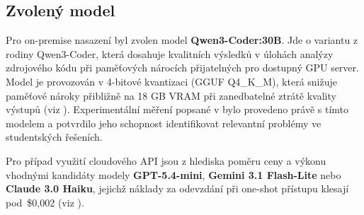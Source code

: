 \subsection{Zvolený model}
\label{subsec:choice-model}

Pro on-premise nasazení byl zvolen model \textbf{Qwen3-Coder:30B}.
Jde o variantu z rodiny Qwen3-Coder, která dosahuje kvalitních výsledků v úlohách analýzy zdrojového kódu při paměťových nárocích přijatelných pro dostupný GPU server.
Model je provozován v 4-bitové kvantizaci (GGUF Q4\_K\_M), která snižuje paměťové nároky přibližně na 18 GB VRAM při zanedbatelné ztrátě kvality výstupů (viz ).
Experimentální měření popsané v  bylo provedeno právě s tímto modelem a potvrdilo jeho schopnost identifikovat relevantní problémy ve studentských řešeních.

Pro případ využití cloudového API jsou z hlediska poměru ceny a výkonu vhodnými kandidáty modely \textbf{GPT-5.4-mini}, \textbf{Gemini 3.1 Flash-Lite} nebo \textbf{Claude 3.0 Haiku}, jejichž náklady za odevzdání při one-shot přístupu klesají pod~\$0,002 (viz ).

\endinput